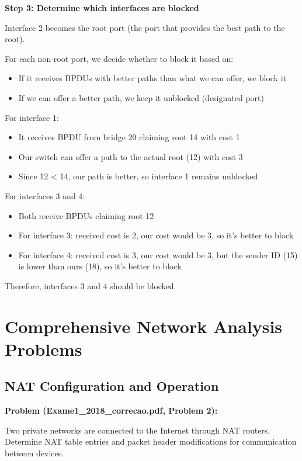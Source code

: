 \documentclass[11pt,a4paper]{article}
\begin{document}
\textbf{Step 3: Determine which interfaces are blocked}

Interface 2 becomes the root port (the port that provides the best path to the root).

For each non-root port, we decide whether to block it based on:
\begin{itemize}
    \item If it receives BPDUs with better paths than what we can offer, we block it
    \item If we can offer a better path, we keep it unblocked (designated port)
\end{itemize}

For interface 1:
\begin{itemize}
    \item It receives BPDU from bridge 20 claiming root 14 with cost 1
    \item Our switch can offer a path to the actual root (12) with cost 3
    \item Since 12 < 14, our path is better, so interface 1 remains unblocked
\end{itemize}

For interfaces 3 and 4:
\begin{itemize}
    \item Both receive BPDUs claiming root 12
    \item For interface 3: received cost is 2, our cost would be 3, so it's better to block
    \item For interface 4: received cost is 3, our cost would be 3, but the sender ID (15) is lower than ours (18), so it's better to block
\end{itemize}

Therefore, interfaces 3 and 4 should be blocked.

\section{Comprehensive Network Analysis Problems}

\subsection{NAT Configuration and Operation}
\textbf{Problem (Exame1\_2018\_correcao.pdf, Problem 2):}

Two private networks are connected to the Internet through NAT routers. Determine NAT table entries and packet header modifications for communication between devices.
\end{document}
